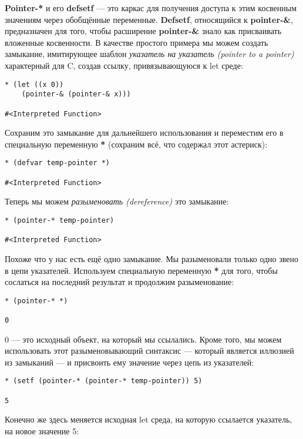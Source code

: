 \textbf{Pointer-*} и его \textbf{defsetf} --- это каркас для получения доступа к этим косвенным значениям через обобщённые переменные. \textbf{Defsetf}, относящийся к \textbf{pointer-\&}, предназначен для того, чтобы расширение \textbf{pointer-\&} знало как присваивать вложенные косвенности. В качестве простого примера мы можем создать замыкание, имитирующее шаблон \emph{указатель на указатель (pointer to a pointer)} характерный для C, создав ссылку, привязывающуюся к let среде:

\begin{verbatim}
* (let ((x 0))
    (pointer-& (pointer-& x)))

#<Interpreted Function>
\end{verbatim}

Сохраним это замыкание для дальнейшего использования и переместим его в специальную переменную \textbf{*} (сохраним всё, что содержал этот астериск):

\begin{verbatim}
* (defvar temp-pointer *)

#<Interpreted Function>
\end{verbatim}

Теперь мы можем \emph{разыменовать (dereference)} это замыкание:

\begin{verbatim}
* (pointer-* temp-pointer)

#<Interpreted Function>
\end{verbatim}

Похоже что у нас есть ещё одно замыкание. Мы разыменовали только одно звено в цепи указателей. Используем специальную переменную \textbf{*} для того, чтобы сослаться на последний результат и продолжим разыменование:

\begin{verbatim}
* (pointer-* *)

0
\end{verbatim}

0 --- это исходный объект, на который мы ссылались. Кроме того, мы можем использовать этот разыменовывающий синтаксис --- который является иллюзией из замыканий --- и присвоить ему значение через цепь из указателей:

\begin{verbatim}
* (setf (pointer-* (pointer-* temp-pointer)) 5)

5
\end{verbatim}

Конечно же здесь меняется исходная let среда, на которую ссылается указатель, на новое значение 5:

